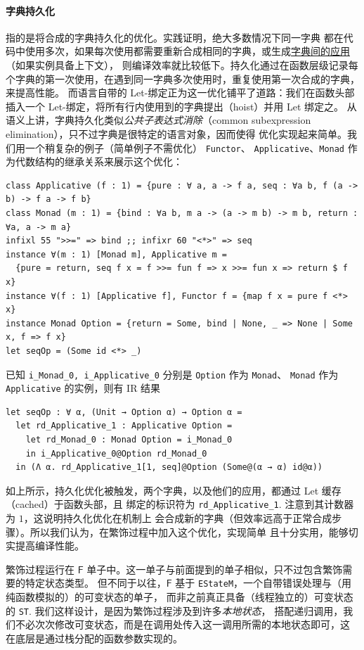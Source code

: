 \documentclass[a4paper, 11pt]{article}
\theoremstyle{remark}\newtheorem*{remark}{Remark}
\theoremstyle{definition}\newtheorem*{definition}{Definition}
\begin{document}
\paragraph{字典持久化} 指的是将合成的字典持久化的优化。实践证明，绝大多数情况下同一字典
都在代码中使用多次，如果每次使用都需要重新合成相同的字典，或生成\underline{字典间的应用}（如果实例具备上下文），
则编译效率就比较低下。持久化通过在函数层级记录每个字典的第一次使用，在遇到同一字典多次使用时，重复使用第一次合成的字典，来提高性能。
而语言自带的 Let-绑定正为这一优化铺平了道路：我们在函数头部插入一个 Let-绑定，将所有行内使用到的字典提出（hoist）并用 Let 绑定之。
从语义上讲，字典持久化类似\emph{公共子表达式消除}（common subexpression elimination），只不过字典是很特定的语言对象，因而使得
优化实现起来简单。我们用一个稍复杂的例子（简单例子不需优化） \texttt{Functor}、 \texttt{Applicative}、\texttt{Monad}
作为代数结构的继承关系来展示这个优化：
\begin{verbatim}
class Applicative (f : 1) = {pure : ∀ a, a -> f a, seq : ∀a b, f (a -> b) -> f a -> f b}
class Monad (m : 1) = {bind : ∀a b, m a -> (a -> m b) -> m b, return : ∀a, a -> m a}
infixl 55 ">>=" => bind ;; infixr 60 "<*>" => seq
instance ∀(m : 1) [Monad m], Applicative m =
  {pure = return, seq f x = f >>= fun f => x >>= fun x => return $ f x}
instance ∀(f : 1) [Applicative f], Functor f = {map f x = pure f <*> x}
instance Monad Option = {return = Some, bind | None, _ => None | Some x, f => f x}
let seqOp = (Some id <*> _)
\end{verbatim}
已知 \texttt{i\_Monad\_0, i\_Applicative\_0} 分别是 \texttt{Option} 作为 \texttt{Monad}、
\texttt{Monad} 作为 \texttt{Applicative} 的实例，则有 IR 结果

\begin{verbatim}
let seqOp : ∀ α, (Unit → Option α) → Option α =
  let rd_Applicative_1 : Applicative Option =
    let rd_Monad_0 : Monad Option = i_Monad_0
    in i_Applicative_0@Option rd_Monad_0
  in (Λ α. rd_Applicative_1[1, seq]@Option (Some@(α → α) id@α))
\end{verbatim}

如上所示，持久化优化被触发，两个字典，以及他们的应用，都通过 Let 缓存（cached）于函数头部，且
绑定的标识符为 \texttt{rd\_Applicative\_1}. 注意到其计数器为 $1$，这说明持久化优化在机制上
会合成新的字典（但效率远高于正常合成步骤）。所以我们认为，在繁饰过程中加入这个优化，实现简单
且十分实用，能够切实提高编译性能。

繁饰过程运行在 $\mathsf{F}$ 单子中。这一单子与前面提到的单子相似，只不过包含繁饰需要的特定状态类型。
但不同于以往，$\mathsf{F}$ 基于 \texttt{EStateM}，一个自带错误处理与（用纯函数模拟的）的可变状态的单子，
而非之前真正具备（线程独立的）可变状态的 \texttt{ST}. 我们这样设计，是因为繁饰过程涉及到许多\emph{本地状态}，
搭配递归调用，我们不必次次修改可变状态，而是在调用处传入这一调用所需的本地状态即可，这
在底层是通过栈分配的函数参数实现的。
\end{document}
